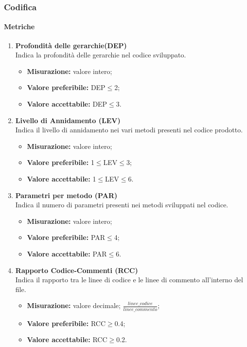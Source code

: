 	\subsubsection{Codifica}
		\paragraph{Metriche} 
		\begin{enumerate}
		\item[]
		
			\textbf{Profondità delle gerarchie(DEP)}\\
			Indica la profondità delle gerarchie nel codice sviluppato.
			\begin{itemize}
				\item \textbf{Misurazione:} valore intero;
				\item \textbf{Valore preferibile:} DEP$\leq$2;
				\item \textbf{Valore accettabile:} DEP$\leq$3.
			\end{itemize}
		\item[]
			\textbf{Livello di Annidamento (LEV)}\\
			Indica il livello di annidamento nei vari metodi presenti nel codice prodotto.
			\begin{itemize}
				\item \textbf{Misurazione:} valore intero;
				\item \textbf{Valore preferibile:} 1$\leq$LEV$\leq$3;
				\item \textbf{Valore accettabile:} 1$\leq$LEV$\leq$6.
			\end{itemize}
		\item[]
			\textbf{Parametri per metodo (PAR)}\\
			Indica il numero di parametri presenti nei metodi sviluppati nel codice.
			\begin{itemize}
				\item \textbf{Misurazione:} valore intero;
				\item \textbf{Valore preferibile:} PAR$\leq$4;
				\item \textbf{Valore accettabile:} PAR$\leq$6.
			\end{itemize}
		\item[]
			\textbf{Rapporto Codice-Commenti (RCC)}\\
			Indica il rapporto tra le linee di codice e le linee di commento all'interno del file.
			\begin{itemize}
				\item \textbf{Misurazione:} valore decimale; $\frac{linee\_codice}{linee\_commento}$;
				\item \textbf{Valore preferibile:} RCC$\geq$0.4;
				\item \textbf{Valore accettabile:} RCC$\geq$0.2.
			\end{itemize}
		\end{enumerate}

